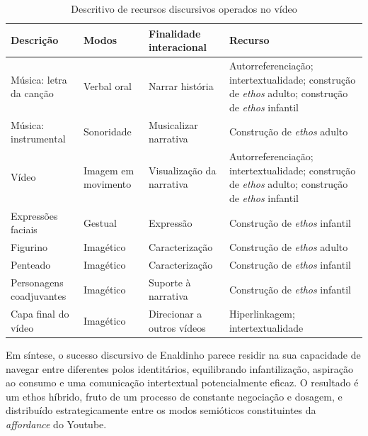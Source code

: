 \documentclass[portuguese]{textolivre}
\begin{document}
\begin{table}[htbp]
\centering
\begin{threeparttable}
\caption{Descritivo de recursos discursivos operados no vídeo}
\label{tab3}

\begin{tabularx}{\textwidth}{
>{\raggedright\arraybackslash}p{3.5cm}
>{\raggedright\arraybackslash}p{2.5cm}
>{\raggedright\arraybackslash}p{3.2cm}
X}
\toprule
Descrição &
Modos &
Finalidade interacional &
Recurso \\
\midrule

Música: letra da canção &
Verbal oral &
Narrar história &
Autorreferenciação; intertextualidade; construção de \textit{ethos} adulto; construção de \textit{ethos} infantil \\

Música: instrumental &
Sonoridade &
Musicalizar narrativa &
Construção de \textit{ethos} adulto \\

Vídeo &
Imagem em movimento &
Visualização da narrativa &
Autorreferenciação; intertextualidade; construção de \textit{ethos} adulto; construção de \textit{ethos} infantil \\

Expressões faciais &
Gestual &
Expressão &
Construção de \textit{ethos} infantil \\

Figurino &
Imagético &
Caracterização &
Construção de \textit{ethos} adulto \\

Penteado &
Imagético &
Caracterização &
Construção de \textit{ethos} infantil \\

Personagens coadjuvantes &
Imagético &
Suporte à narrativa &
Construção de \textit{ethos} infantil \\

Capa final do vídeo &
Imagético &
Direcionar a outros vídeos &
Hiperlinkagem; intertextualidade \\

\bottomrule
\end{tabularx}


\end{threeparttable}
\end{table}
Em síntese, o sucesso discursivo de Enaldinho parece residir na sua capacidade de navegar entre diferentes polos identitários, equilibrando infantilização, aspiração ao consumo e uma comunicação intertextual potencialmente eficaz. O resultado é um ethos híbrido, fruto de um processo de constante negociação e dosagem, e distribuído estrategicamente entre os modos semióticos constituintes da \textit{affordance} do Youtube.
\end{document}
